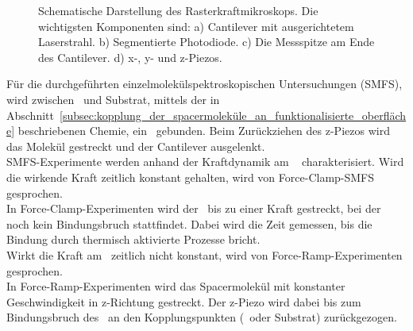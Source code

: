 \begin{figure}[h]
	\centering
	\caption[Schematische Darstellung des Rasterkraftmikroskops]{Schematische Darstellung des Rasterkraftmikroskops. Die wichtigsten Komponenten sind: a) Cantilever mit ausgerichtetem Laserstrahl. b) Segmentierte Photodiode. c) Die Messspitze am Ende des Cantilever. d) x-, y- und z-Piezos.}
	\label{fig:afm_schema}
\end{figure}

Für die durchgeführten einzelmolekülspektroskopischen Untersuchungen (\ac{SMFS}), wird zwischen \spitze~und Substrat, mittels der in Abschnitt~\ref{subsec:kopplung_der_spacermoleküle_an_funktionalisierte_oberfläche} beschriebenen Chemie, ein \spacer~gebunden. Beim Zurückziehen des z-Piezos wird das Molekül gestreckt und der Cantilever ausgelenkt.\\

\ac{SMFS}-Experimente werden anhand der Kraftdynamik am \space~ charakterisiert. Wird die wirkende Kraft zeitlich konstant gehalten, wird von Force-Clamp-\ac{SMFS} gesprochen.\\
In Force-Clamp-Experimenten wird der \spacer~bis zu einer Kraft gestreckt, bei der noch kein Bindungsbruch stattfindet. Dabei wird die Zeit gemessen, bis die Bindung durch thermisch aktivierte Prozesse bricht.\\

Wirkt die Kraft am \spacer~zeitlich nicht konstant, wird von Force-Ramp-Experimenten gesprochen.\\
In Force-Ramp-Experimenten wird das Spacermolekül mit konstanter Geschwindigkeit in z-Richtung gestreckt. Der z-Piezo wird dabei bis zum Bindungsbruch des \spacer~an den Kopplungspunkten (\spitze~oder Substrat) zurückgezogen.

